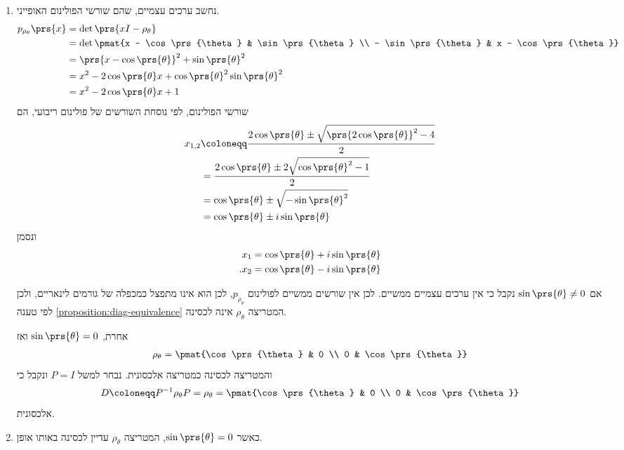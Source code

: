 \documentclass[a4paper,10pt,twoside,openany]{book}
\begin{document}
\begin{solution}
\begin{enumerate}
\item
נחשב ערכים עצמיים, שהם שורשי הפולינום האופייני.
\begin{align*}
p_{\rho_\theta}\prs{x} &= \det\prs{xI - \rho_\theta}
\\&= \det\pmat{x - \cos\prs{\theta} & \sin\prs{\theta} \\
- \sin\prs{\theta} & x - \cos\prs{\theta}}
\\&=
\prs{x-\cos\prs{\theta}}^2 + \sin\prs{\theta}^2
\\&= x^2 - 2 \cos\prs{\theta} x + \cos\prs{\theta}^2 \sin\prs{\theta}^2
\\&= x^2 - 2 \cos\prs{\theta} x + 1
\end{align*}
שורשי הפולינום, לפי נוסחת השורשים של פולינום ריבועי, הם
\begin{align*}
x_{1,2} &\coloneqq \frac{2 \cos\prs{\theta} \pm \sqrt{\prs{2\cos\prs{\theta}}^2 - 4}}{2}
\\&=
\frac{2 \cos\prs{\theta} \pm 2 \sqrt{\cos\prs{\theta}^2 - 1}}{2}
\\&=
\cos\prs{\theta} \pm \sqrt{- \sin\prs{\theta}^2}
\\&=
\cos\prs{\theta} \pm i \sin\prs{\theta}
\end{align*}
ונסמן
\begin{align*}
x_1 &= \cos\prs{\theta} + i \sin\prs{\theta} \\
\text{.} x_2 &= \cos\prs{\theta} - i \sin\prs{\theta}
\end{align*}

אם
$\sin\prs{\theta} \neq 0$
נקבל כי אין ערכים עצמיים ממשיים. לכן אין שורשים ממשיים לפולינום
$p_{\rho_\theta}$,
לכן הוא אינו מתפצל כמכפלה של גורמים לינאריים, ולכן לפי טענה
\ref{proposition:diag-equivalence}
המטריצה
$\rho_\theta$
אינה לכסינה.

אחרת,
$\sin\prs{\theta} = 0$
ואז
\begin{align*}
\rho_\theta = \pmat{\cos\prs{\theta} & 0 \\ 0 & \cos\prs{\theta}}
\end{align*}
והמטריצה לכסינה כמטריצה אלכסונית. נבחר למשל
$P = I$
ונקבל כי
\[D \coloneqq P^{-1} \rho_\theta P = \rho_\theta = \pmat{\cos\prs{\theta} & 0 \\ 0 & \cos\prs{\theta}}\]
אלכסונית.

\item כאשר
$\sin\prs{\theta} = 0$,
המטריצה
$\rho_\theta$
עדיין לכסינה באותו אופן.


\end{enumerate}
\end{solution}
\end{document}
